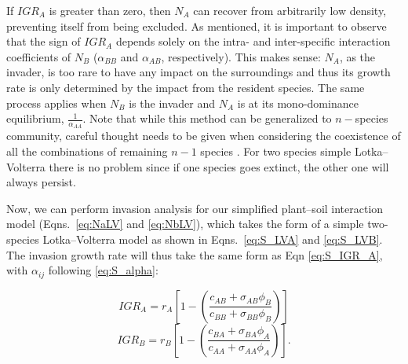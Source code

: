 \noindent If $IGR_{A}$ is greater than zero, then $N_{A}$ can recover from arbitrarily low density, preventing itself from being excluded. As mentioned, it is important to observe that the sign of $IGR_{A}$ depends solely on the intra- and inter-specific interaction coefficients of $N_{B}$ ($\alpha_{BB}$ and $\alpha_{AB}$, respectively). This makes sense: $N_{A}$, as the invader, is too rare to have any impact on the surroundings and thus its growth rate is only determined by the impact from the resident species. The same process applies when $N_{B}$ is the invader and $N_{A}$ is at its mono-dominance equilibrium, $\frac{1}{\alpha_{AA}}$. Note that while this method can be generalized to $n-$species community, careful thought needs to be given when considering the coexistence of all the combinations of remaining $n-1$ species \citep{Barabas2018}. For two species simple Lotka--Volterra there is no problem since if one species goes extinct, the other one will always persist.
\par


Now, we can perform invasion analysis for our simplified plant--soil interaction model (Eqns.~\ref{eq:NaLV} and \ref{eq:NbLV}), which takes the form of a simple two-species Lotka--Volterra model as shown in Eqns.~\ref{eq:S_LVA} and \ref{eq:S_LVB}. The invasion growth rate will thus take the same form as Eqn \ref{eq:S_IGR_A}, with $\alpha_{ij}$ following \ref{eq:S_alpha}:

\begin{equation}
IGR_{A} =
r_{A}\left [ 1 - \left ( \frac{c_{AB}+\sigma_{AB}\phi_{B}} {c_{BB}+\sigma_{BB}\phi_{B}} \right ) \right ]
\tag{S4.23}\label{eq:IGR_A}
\end{equation}
\begin{equation}
IGR_{B} =
r_{B}\left [ 1 - \left ( \frac{c_{BA}+\sigma_{BA}\phi_{A}} {c_{AA}+\sigma_{AA}\phi_{A}} \right ) \right ] .
\tag{S4.24}\label{eq:IGR_B}
\end{equation}
\par



\clearpage
